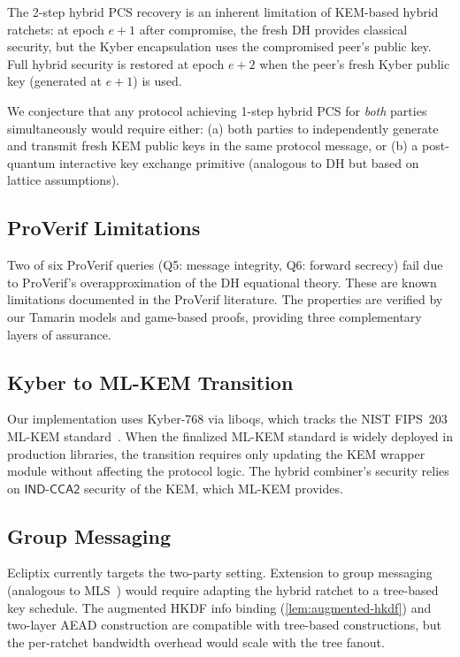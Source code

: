 \documentclass[11pt,a4paper]{article}
\theoremstyle{definition}
\newcommand{\INDCCA}{\textsf{IND-CCA2}}
\begin{document}
The 2-step hybrid PCS recovery is an inherent limitation of KEM-based hybrid ratchets: at epoch $e+1$ after compromise, the fresh DH provides classical security, but the Kyber encapsulation uses the compromised peer's public key. Full hybrid security is restored at epoch $e+2$ when the peer's fresh Kyber public key (generated at $e+1$) is used.

We conjecture that any protocol achieving 1-step hybrid PCS for \emph{both} parties simultaneously would require either: (a) both parties to independently generate and transmit fresh KEM public keys in the same protocol message, or (b) a post-quantum interactive key exchange primitive (analogous to DH but based on lattice assumptions).

\subsection{ProVerif Limitations}

Two of six ProVerif queries (Q5: message integrity, Q6: forward secrecy) fail due to ProVerif's overapproximation of the DH equational theory. These are known limitations documented in the ProVerif literature. The properties are verified by our Tamarin models and game-based proofs, providing three complementary layers of assurance.

\subsection{Kyber to ML-KEM Transition}

Our implementation uses Kyber-768 via liboqs, which tracks the NIST FIPS~203 ML-KEM standard~\cite{fips203}. When the finalized ML-KEM standard is widely deployed in production libraries, the transition requires only updating the KEM wrapper module without affecting the protocol logic. The hybrid combiner's security relies on $\INDCCA$ security of the KEM, which ML-KEM provides.

\subsection{Group Messaging}

Ecliptix currently targets the two-party setting. Extension to group messaging (analogous to MLS~\cite{mls-rfc}) would require adapting the hybrid ratchet to a tree-based key schedule. The augmented HKDF info binding (\cref{lem:augmented-hkdf}) and two-layer AEAD construction are compatible with tree-based constructions, but the per-ratchet bandwidth overhead would scale with the tree fanout.
\end{document}

